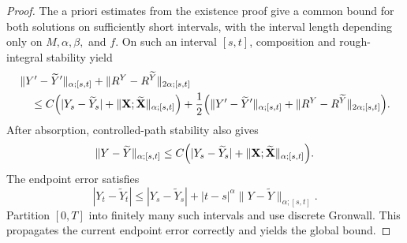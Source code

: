\begin{proof}
The a priori estimates from the existence proof give a common bound for both
solutions on sufficiently short intervals, with the interval length depending
only on $M,\alpha,\beta,$ and $f$.  On such an interval $[s,t]$, composition
and rough-integral stability yield
\begin{align*}
&\|Y'-\widetilde Y'\|_{\alpha;[s,t]}
 +\|R^Y-R^{\widetilde Y}\|_{2\alpha;[s,t]}\\
&\quad\le C\Bigl(
 |Y_s-\widetilde Y_s|
 +\|\mathbf X;\widetilde{\mathbf X}\|_{\alpha;[s,t]}
 \Bigr)
 +\frac12\Bigl(
 \|Y'-\widetilde Y'\|_{\alpha;[s,t]}
 +\|R^Y-R^{\widetilde Y}\|_{2\alpha;[s,t]}
 \Bigr).
\end{align*}
After absorption, controlled-path stability also gives
\[
 \|Y-\widetilde Y\|_{\alpha;[s,t]}
 \le C\Bigl(|Y_s-\widetilde Y_s|
 +\|\mathbf X;\widetilde{\mathbf X}\|_{\alpha;[s,t]}\Bigr).
\]
The endpoint error satisfies
\[
 |Y_t-\widetilde Y_t|
 \le |Y_s-\widetilde Y_s|
 +|t-s|^\alpha\|Y-\widetilde Y\|_{\alpha;[s,t]}.
\]
Partition $[0,T]$ into finitely many such intervals and use discrete Gronwall.
This propagates the current endpoint error correctly and yields the global
bound.
\end{proof}
